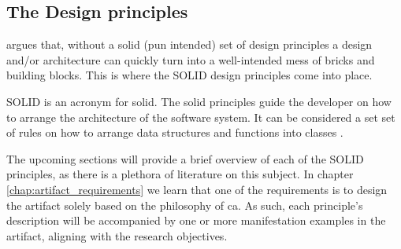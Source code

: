 \subsection{The Design principles} \label{sec:design_principles}

 argues that, without a solid (pun intended) set of
design principles a design and/or architecture can quickly turn into a well-intended mess
of bricks and building blocks. This is where the SOLID design principles come into place.

SOLID is an acronym for \gls{solid}. The \gls{solid} principles guide the developer on how
to arrange the architecture of the software system. It can be considered a set set of
rules on how to arrange data structures and functions into classes
\parencite[78]{robert_c_martin_clean_2018}.

The upcoming sections will provide a brief overview of each of the SOLID principles, as
there is a plethora of literature on this subject. In chapter
\ref{chap:artifact_requirements} we learn that one of the requirements is to design the
artifact solely based on the philosophy of \gls{ca}. As such, each principle's description
will be accompanied by one or more manifestation examples in the artifact, aligning with
the research objectives.